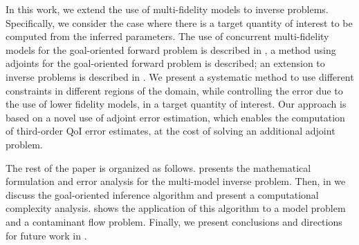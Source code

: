 
In this work, we extend the use of multi-fidelity models to inverse problems. Specifically, we consider the case where there is a target quantity of interest to be computed from the inferred parameters. The use of concurrent multi-fidelity models for the goal-oriented forward problem is described in \cite{OdenPrudetal06}, a method using adjoints for the goal-oriented forward problem is described; an extension to inverse problems is described in \cite{OdenPrudetal10}. We present a systematic method to use different constraints in different regions of the domain, while controlling the error due to the use of lower fidelity models, in a target quantity of interest. Our approach is based on a novel use of adjoint error estimation, which enables the computation of third-order QoI error estimates, at the cost of solving an additional adjoint problem.

The rest of the paper is organized as follows.  presents the mathematical formulation and error analysis for the multi-model inverse problem. Then, in  we discuss the goal-oriented inference algorithm and present a computational complexity analysis.  shows the application of this algorithm to a model problem and a contaminant flow problem. Finally, we present conclusions and directions for future work in .

